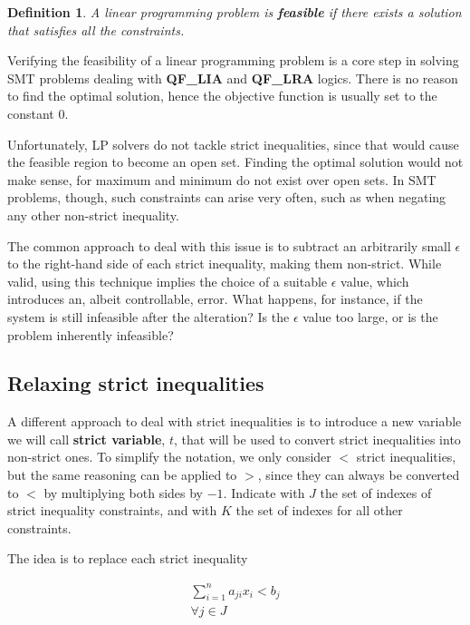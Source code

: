 \documentclass[preview,border=12pt,varwidth]{report}
\newtheorem{definition}{Definition}
\begin{document}
\begin{definition}
    A linear programming problem is \textbf{feasible} if there exists a solution that satisfies all the constraints.
\end{definition}

Verifying the feasibility of a linear programming problem is a core step in solving SMT problems dealing with \textbf{QF\_LIA} and \textbf{QF\_LRA} logics.
There is no reason to find the optimal solution, hence the objective function is usually set to the constant $0$.

Unfortunately, LP solvers do not tackle strict inequalities, since that would cause the feasible region to become an open set.
Finding the optimal solution would not make sense, for maximum and minimum do not exist over open sets.
In SMT problems, though, such constraints can arise very often, such as when negating any other non-strict inequality.

The common approach to deal with this issue is to subtract an arbitrarily small $\epsilon$ to the right-hand side of each strict inequality, making them non-strict.
While valid, using this technique implies the choice of a suitable $\epsilon$ value, which introduces an, albeit controllable, error.
What happens, for instance, if the system is still infeasible after the alteration?
Is the $\epsilon$ value too large, or is the problem inherently infeasible?

\subsection*{Relaxing strict inequalities}

A different approach to deal with strict inequalities is to introduce a new variable we will call \textbf{strict variable}, $t$, that will be used to convert strict inequalities into non-strict ones.
To simplify the notation, we only consider $<$ strict inequalities, but the same reasoning can be applied to $>$, since they can always be converted to $<$ by multiplying both sides by $-1$.
Indicate with $J$ the set of indexes of strict inequality constraints, and with $K$ the set of indexes for all other constraints.

The idea is to replace each strict inequality

\begin{align*}
    \sum_{i=1}^{n} a_{ji}x_{i} < b_j \\
    \forall j \in J                  \\
\end{align*}
\end{document}
